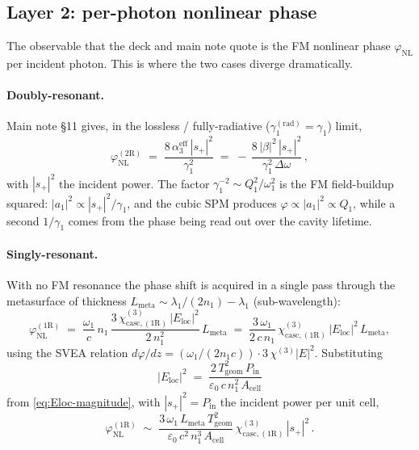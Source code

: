 \documentclass[11pt,a4paper]{article}
\newcommand{\eps}{\varepsilon}
\newcommand{\chithree}{\chi^{(3)}}
\newcommand{\Dom}{\Delta\omega}
\newcommand{\chicascOneR}{\chi^{(3)}_{\text{casc},(1\mathrm R)}}
\begin{document}
\subsection*{Layer 2: per-photon nonlinear phase}

The observable that the deck and main note quote is the FM nonlinear phase
$\varphi_\text{NL}$ per incident photon.  This is where the two cases
diverge dramatically.

\paragraph{Doubly-resonant.}
Main note \S 11 gives, in the lossless / fully-radiative
($\gamma_1^{(\text{rad})}=\gamma_1$) limit,
\begin{equation}
  \varphi_\text{NL}^{(2\mathrm R)}\;=\;
   \frac{8\,\alpha_3^\text{eff}\,|s_+|^{2}}{\gamma_1^{2}}
   \;=\;-\,\frac{8\,|\beta|^{2}\,|s_+|^{2}}{\gamma_1^{2}\,\Dom}\,,
  \label{eq:phi-2R}
\end{equation}
with $|s_+|^{2}$ the incident power.  The factor $\gamma_1^{-2}\sim
Q_1^{2}/\omega_1^{2}$ is the FM field-buildup squared:
$|a_1|^{2}\propto |s_+|^{2}/\gamma_1$, and the cubic SPM produces
$\varphi\propto|a_1|^{2}\propto Q_1$, while a second $1/\gamma_1$ comes
from the phase being read out over the cavity lifetime.

\paragraph{Singly-resonant.}
With no FM resonance the phase shift is acquired in a single pass through
the metasurface of thickness $L_\text{meta}\sim\lambda_1/(2 n_1)\!-\!\lambda_1$
(sub-wavelength):
\begin{equation}
  \varphi_\text{NL}^{(1\mathrm R)}
   \;=\;\frac{\omega_1}{c}\,n_1\,
        \frac{3\,\chicascOneR\,|E_\text{loc}|^{2}}{2\,n_1^{2}}\,L_\text{meta}
   \;=\;\frac{3\,\omega_1}{2\,c\,n_1}\,
        \chicascOneR\,|E_\text{loc}|^{2}\,L_\text{meta},
  \label{eq:phi-1R}
\end{equation}
using the SVEA relation
$d\varphi/dz=(\omega_1/(2 n_1 c))\cdot 3\,\chithree |E|^{2}$.
Substituting
\begin{equation*}
  |E_\text{loc}|^{2}\;=\;\frac{2\,T_\text{geom}^{2}\,P_\text{in}}
                              {\eps_0\,c\,n_1^{2}\,A_\text{cell}}
\end{equation*}
from \eqref{eq:Eloc-magnitude}, with $|s_+|^{2}=P_\text{in}$ the incident
power per unit cell,
\begin{equation}
  \varphi_\text{NL}^{(1\mathrm R)}
   \;\sim\;\frac{3\,\omega_1\,L_\text{meta}\,T_\text{geom}^{2}}
               {\eps_0\,c^{2}\,n_1^{3}\,A_\text{cell}}\,
           \chicascOneR\,|s_+|^{2}\,.
  \label{eq:phi-1R-pow}
\end{equation}
\end{document}
